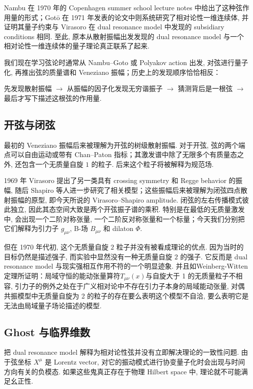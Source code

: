 \documentclass[10pt]{article}
\numberwithin{equation}{section}
\begin{document}
Nambu 在 1970 年的 Copenhagen summer school lecture notes 中给出了这种弦作用量的形式；Gotō 在 1971 年发表的论文中则系统研究了相对论性一维连续体, 并证明其量子约束与 Virasoro 在 dual resonance model 中发现的 subsidiary conditions 相同\cite{Goto1971,CappelliEtAl2012}. 至此, 原本从散射振幅出发发现的 dual resonance model 与一个相对论性一维连续体的量子理论真正联系了起来. 

我们现在学习弦论时通常从 Nambu–Goto 或 Polyakov action 出发, 对弦进行量子化, 再推出弦的质量谱和 Veneziano 振幅；历史上的发现顺序恰恰相反：

先发现散射振幅 $\rightarrow$ 从振幅的因子化发现无穷谐振子 $\rightarrow$ 猜测背后是一根弦 $\rightarrow$ 最后才写下描述这根弦的作用量. 

\subsection{开弦与闭弦}

最初的 Veneziano 振幅后来被理解为开弦的树级散射振幅. 对于开弦, 弦的两个端点可以自由运动或带有 Chan–Paton 指标；其激发谱中除了无限多个有质量态之外, 还包含一个无质量自旋 $1$ 的粒子. 后来这个粒子将被解释为规范场. 

1969 年 Virasoro 提出了另一类具有 crossing symmetry 和 Regge behavior 的振幅, 随后 Shapiro 等人进一步研究了相关模型；这些振幅后来被理解为闭弦四点散射振幅的原型, 即今天所说的 Virasoro–Shapiro amplitude\cite{Virasoro1969,Shapiro1969}. 闭弦的左右传播模式彼此独立, 因此其态空间大致是两个开弦振子谱的乘积. 特别是在最低的无质量激发中, 会出现一个二阶对称张量, 一个二阶反对称张量和一个标量；今天我们分别把它们解释为引力子 $g_{\mu\nu}$, B-场 $B_{\mu\nu}$ 和 dilaton $\Phi$. 

但在 1970 年代初, 这个无质量自旋 $2$ 粒子并没有被看成理论的优点. 因为当时的目标仍然是描述强子, 而实验中显然没有一种无质量自旋 $2$ 的强子. 它反而是 dual resonance model 与现实强相互作用不符的一个明显迹象.
并且如Weinberg-Witten定理所证明：局域守恒的能动张量算符$T_{\mu\nu}(x)$与自旋大于 1 的无质量粒子不相容, 引力子的例外之处在于广义相对论中不存在引力子本身的局域能动张量, 对偶共振模型中无质量自旋为 2 的粒子的存在要么表明这个模型不自洽, 要么表明它是无法由局域量子场论描述的模型\cite{WeinbergWitten1980}.

\subsection{Ghost 与临界维数}

把 dual resonance model 解释为相对论性弦并没有立即解决理论的一致性问题. 由于弦坐标 $X^\mu$ 是 Lorentz vector, 对它的振动模式进行协变量子化时会出现与时间方向有关的负模态. 如果这些鬼真正存在于物理 Hilbert space 中, 理论就不可能满足幺正性. 
\end{document}
